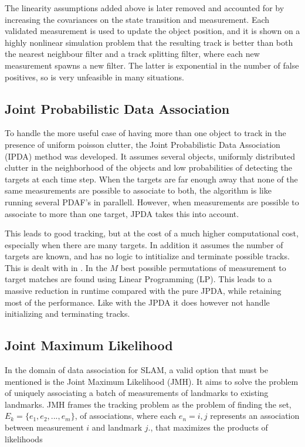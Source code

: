 The linearity assumptions added above is later removed and accounted for by increasing the covariances on the state transition and measurement. Each validated measurement is used to update the object position, and it is shown on a highly nonlinear simulation problem that the resulting track is better than both the nearest neighbour filter and a track splitting filter, where each new measurement spawns a new filter. The latter is exponential in the number of false positives, so is very unfeasible in many situations. 

\subsection{Joint Probabilistic Data Association}

To handle the more useful case of having more than one object to track in the presence of uniform poisson clutter, the Joint Probabilistic Data Association (IPDA) method was developed\cite{JPDA}. It assumes several objects, uniformly distributed clutter in the neighborhood of the objects and low probabilities of detecting the targets at each time step. When the targets are far enough away that none of the same measurements are possible to associate to both, the algorithm is like running several PDAF's in parallell. However, when measurements are possible to associate to more than one target, JPDA takes this into account. 

This leads to good tracking, but at the cost of a much higher computational cost, especially when there are many targets. In addition it assumes the number of targets are known, and has no logic to intitialize and terminate possible tracks. This is dealt with in \cite{Multitrack}. In \cite{JPDARev} the $M$ best possible permutations of measurement to target matches are found using Linear Programming (LP). This leads to a massive reduction in runtime compared with the pure JPDA, while retaining most of the performance. Like with the JPDA it does however not handle initializing and terminating tracks. 

\subsection{Joint Maximum Likelihood}

In the domain of data association for SLAM, a valid option that must be mentioned is the Joint Maximum Likelihood (JMH)\cite{JMH}. It aims to solve the problem of uniquely associating a batch of measurements of landmarks to existing landmarks. JMH frames the tracking problem as the problem of finding the set, $E_k = \{ e_1, e_2, ... , e_m\} $, of associations, where each $e_n = {i,j}$ represents an association between measurement $i$ and landmark $j$., that maximizes the products of likelihoods

